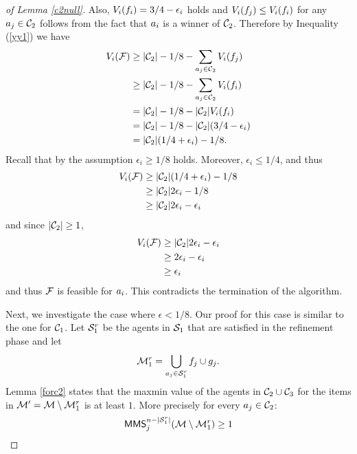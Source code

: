 \begin{proof}[of Lemma \ref{c2null}]
Also, $V_i(f_i) = {3/4} - \epsilon_i$ holds and $V_i(f_j) \leq V_i(f_i)$ for any $a_j \in \mathcal{C}_2$ follows from the fact that $a_i$ is a winner of $\mathcal{C}_2$. Therefore by Inequality (\ref{yy1}) we have
\begin{equation*}
\begin{split}
V_i({\mathcal{F}}) & \geq |\mathcal{C}_2| - 1/8 - \sum_{a_j \in \mathcal{C}_2} {V_i(f_j)}\\
& \geq |\mathcal{C}_2| - 1/8 - \sum_{a_j \in \mathcal{C}_2} {V_i(f_i)}\\
& = |\mathcal{C}_2| - 1/8 - |\mathcal{C}_2| {V_i(f_i)}\\
& = |\mathcal{C}_2| - 1/8 - |\mathcal{C}_2| ({3/4} - \epsilon_i)\\
& = |\mathcal{C}_2| ({1/4} + \epsilon_i) - 1/8.
\end{split}
\end{equation*}
Recall that by the assumption $\epsilon_i \geq 1/8$ holds. Moreover, $\epsilon_i\leq 1/4$, and thus
\begin{equation*}
\begin{split} 
V_i(\mathcal{F}) & \geq |\mathcal{C}_2| ({1/4} + \epsilon_i) - 1/8\\
& \geq |\mathcal{C}_2| 2\epsilon_i - 1/8\\
& \geq |\mathcal{C}_2|  2\epsilon_i - \epsilon_i
\end{split}
\end{equation*}
and since $|\mathcal{C}_2| \geq 1$, 
\begin{equation*}
\begin{split}
V_i(\mathcal{F}) &\geq |\mathcal{C}_2|  2\epsilon_i - \epsilon_i\\
& \geq 2\epsilon_i - \epsilon_i\\
& \geq \epsilon_i
\end{split}
\end{equation*}
 and thus $\mathcal{F}$ is feasible for $a_i$. This contradicts the termination of the algorithm. 

Next, we investigate the case where $\epsilon < {1/8}$. Our proof for this case is similar to the one for $\mathcal{C}_1$. Let $\mathcal{S}^r_{1}$ be the agents in $\mathcal{S}_1$ that are satisfied in the refinement phase and let $$\mathcal{M}^r_1 = \bigcup_{a_j \in \mathcal{S}^r_1} f_j \cup g_j.$$ Lemma \ref{forc2} states that the maxmin value of the agents in $\mathcal{C}_2 \cup \mathcal{C}_3$ for the items in $\mathcal{M}' = \mathcal{M} \setminus \mathcal{M}^r_1$ is at least $1$. More precisely for every $a_j \in \mathcal{C}_2$:
\begin{equation}
\label{c1refine}
 \mathsf{MMS}_{j}^{n- |\mathcal{S}^r_{1}|} ( {\mathcal{M}} \setminus \mathcal{M}^r_{1}) \geq 1 
 \end{equation}  


\end{proof}
